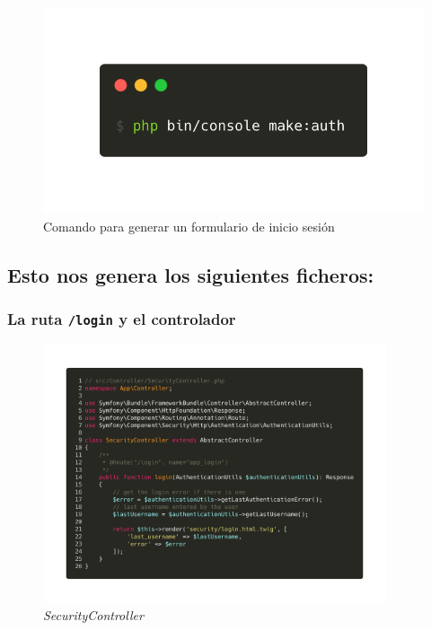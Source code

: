 \begin{figure}[ht]
  \centering
  \includegraphics[width=\textwidth]{../assets/make_auth.png}
  \caption{Comando para generar un formulario de inicio sesión}
  \label{fig:make_auth}
\end{figure}

\clearpage
\subsection*{Esto nos genera los siguientes ficheros:}
\subsubsection{La ruta \textbf{\texttt{/login}} y el controlador}

\begin{figure}[ht]
  \centering
  \includegraphics[width=0.9\textwidth]{../assets/security_controller.png}
  \caption{\textit{SecurityController}}
  \label{fig:security_controller}
\end{figure}


